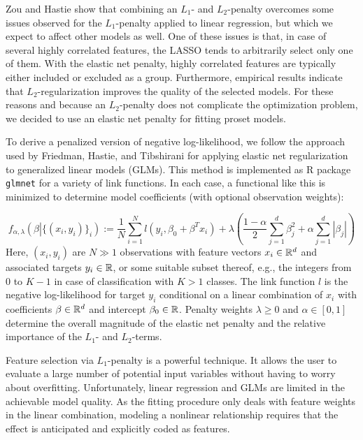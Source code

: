 %
Zou and Hastie \cite{Zou_05} show that combining an $L_1$- and $L_2$-penalty overcomes some issues observed for the $L_1$-penalty applied to linear regression, but which we expect to affect other models as well.
One of these issues is that, in case of several highly correlated features, the LASSO tends to arbitrarily select only one of them.
With the elastic net penalty, highly correlated features are typically either included or excluded as a group.
Furthermore, empirical results indicate that $L_2$-regularization improves the quality of the selected models.
For these reasons and because an $L_2$-penalty does not complicate the optimization problem, we decided to use an elastic net penalty for fitting proset models.\par
%
To derive a penalized version of negative log-likelihood, we follow the approach used by Friedman, Hastie, and Tibshirani \cite{Friedman_10} for applying elastic net regularization to generalized linear models (GLMs).
This method is implemented as R package \texttt{glmnet} \cite{Friedman_10} for a variety of link functions.
In each case, a functional like this is minimized to determine model coefficients (with optional observation weights):\par
%
\begin{equation}
f_{\alpha,\lambda}\left(\beta\left|\{(x_i,y_i)\}_i\right.\right):=\frac{1}{N}\sum_{i=1}^Nl(y_i,\beta_0+\beta^Tx_i)+\lambda\left(\frac{1-\alpha}{2}\sum_{j=1}^d\beta_j^2+\alpha\sum_{j=1}^d|\beta_j|\right)\label{eq_regularization}
\end{equation}
%
Here, $(x_i,y_i)$ are $N\gg1$ observations with feature vectors $x_i\in\mathbb{R}^d$ and associated targets $y_i\in\mathbb{R}$, or some suitable subset thereof, e.g., the integers from $0$ to $K-1$ in case of classification with $K>1$ classes.
The link function $l$ is the negative log-likelihood for target $y_i$ conditional on a linear combination of $x_i$ with coefficients $\beta\in\mathbb{R}^d$ and intercept $\beta_0\in\mathbb{R}$.
Penalty weights $\lambda\geq0$ and $\alpha\in[0,1]$ determine the overall magnitude of the elastic net penalty and the relative importance of the $L_1$- and $L_2$-terms.\par
%
Feature selection via $L_1$-penalty is a powerful technique.
It allows the user to evaluate a large number of potential input variables without having to worry about overfitting.
Unfortunately, linear regression and GLMs are limited in the achievable model quality.
As the fitting procedure only deals with feature weights in the linear combination, modeling a nonlinear relationship requires that the effect is anticipated and explicitly coded as features.
